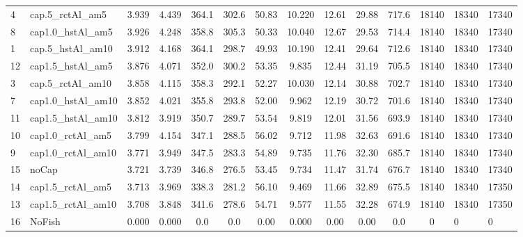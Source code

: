 \documentclass[11pt]{book}
\begin{document}
\begin{landscape}
\begin{longtable}[t]{llccccccccccll}
4 & cap.5\_rctAl\_am5 & 3.939 & 4.439 & 364.1 & 302.6 & 50.83 & 10.220 & 12.61 & 29.88 & 717.6 & 18140 & 18340 & 17340\\
8 & cap1.0\_hstAl\_am5 & 3.926 & 4.248 & 358.8 & 305.3 & 50.33 & 10.040 & 12.67 & 29.53 & 714.4 & 18140 & 18340 & 17340\\
1 & cap.5\_hstAl\_am10 & 3.912 & 4.168 & 364.1 & 298.7 & 49.93 & 10.190 & 12.41 & 29.64 & 712.6 & 18140 & 18340 & 17340\\
12 & cap1.5\_hstAl\_am5 & 3.876 & 4.071 & 352.0 & 300.2 & 53.35 & 9.835 & 12.44 & 31.19 & 705.5 & 18140 & 18340 & 17340\\
3 & cap.5\_rctAl\_am10 & 3.858 & 4.115 & 358.3 & 292.1 & 52.27 & 10.030 & 12.14 & 30.88 & 702.7 & 18140 & 18340 & 17340\\
7 & cap1.0\_hstAl\_am10 & 3.852 & 4.021 & 355.8 & 293.8 & 52.00 & 9.962 & 12.19 & 30.72 & 701.6 & 18140 & 18340 & 17340\\
11 & cap1.5\_hstAl\_am10 & 3.812 & 3.919 & 350.7 & 289.7 & 53.54 & 9.819 & 12.01 & 31.56 & 693.9 & 18140 & 18340 & 17340\\
10 & cap1.0\_rctAl\_am5 & 3.799 & 4.154 & 347.1 & 288.5 & 56.02 & 9.712 & 11.98 & 32.63 & 691.6 & 18140 & 18340 & 17340\\
9 & cap1.0\_rctAl\_am10 & 3.771 & 3.949 & 347.5 & 283.3 & 54.89 & 9.735 & 11.76 & 32.30 & 685.7 & 18140 & 18340 & 17340\\
15 & noCap & 3.721 & 3.739 & 346.8 & 276.5 & 53.45 & 9.734 & 11.47 & 31.74 & 676.7 & 18140 & 18340 & 17340\\
14 & cap1.5\_rctAl\_am5 & 3.713 & 3.969 & 338.3 & 281.2 & 56.10 & 9.469 & 11.66 & 32.89 & 675.5 & 18140 & 18340 & 17350\\
13 & cap1.5\_rctAl\_am10 & 3.708 & 3.848 & 341.6 & 278.6 & 54.71 & 9.577 & 11.55 & 32.28 & 674.9 & 18140 & 18340 & 17350\\
16 & NoFish & 0.000 & 0.000 & 0.0 & 0.0 & 0.00 & 0.000 & 0.00 & 0.00 & 0.0 & 0 & 0 & 0\\*
\end{longtable}
\end{landscape}
\endgroup{}

\newpage
\end{document}
